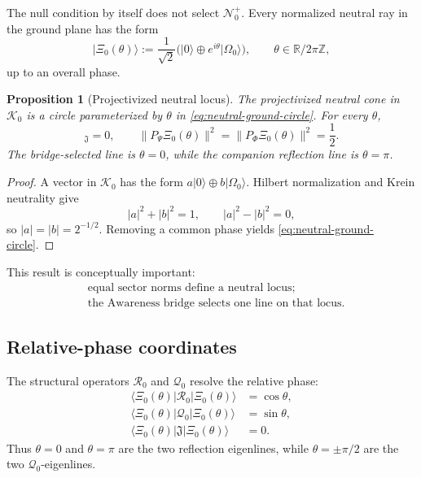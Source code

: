 \documentclass[11pt,reqno]{scrartcl}
\newcommand{\RR}{\mathbb R}
\newcommand{\ZZ}{\mathbb Z}
\newcommand{\fundJ}{\mathfrak J}
\newcommand{\PP}{P_{\Psi}}
\newcommand{\PF}{P_{\Phi}}
\newcommand{\Kzero}{\mathscr K_{0}}
\newcommand{\Rzero}{\mathcal R_{0}}
\newcommand{\Qzero}{\mathcal Q_{0}}
\newcommand{\NzeroPlus}{\mathscr N_{0}^{+}}
\newcommand{\ket}[1]{\lvert #1\rangle}
\newcommand{\bra}[1]{\langle #1\rvert}
\newcommand{\kInner}[2]{[#1,#2]_{\fundJ}}
\theoremstyle{plain}
\newtheorem{proposition}[proposition]{Proposition}
\theoremstyle{definition}
\theoremstyle{remark}
\begin{document}
The null condition by itself does not select \(\NzeroPlus\).  Every normalized
neutral ray in the ground plane has the form
\begin{equation}
  \boxed{
  \ket{\Xi_0(\theta)}
  :=\frac1{\sqrt2}
  \bigl(\ket0\oplus e^{i\theta}\ket{\Omega_0}\bigr),
  \qquad
  \theta\in\RR/2\pi\ZZ,}
  \label{eq:neutral-ground-circle}
\end{equation}
up to an overall phase.

\begin{proposition}[Projectivized neutral locus]
\label{prop:projectivized-neutral-locus}
The projectivized neutral cone in \(\Kzero\) is a circle parameterized by
\(\theta\) in \eqref{eq:neutral-ground-circle}.  For every \(\theta\),
\begin{equation}
  \kInner{\Xi_0(\theta)}{\Xi_0(\theta)}=0,
  \qquad
  \|\PP\Xi_0(\theta)\|^2
  =\|\PF\Xi_0(\theta)\|^2=\frac12.
  \label{eq:neutral-circle-common-properties}
\end{equation}
The bridge-selected line is \(\theta=0\), while the companion reflection
line is \(\theta=\pi\).
\end{proposition}

\begin{proof}
A vector in \(\Kzero\) has the form
\(a\ket0\oplus b\ket{\Omega_0}\).  Hilbert normalization and Krein
neutrality give
\begin{equation}
  |a|^2+|b|^2=1,
  \qquad
  |a|^2-|b|^2=0,
\end{equation}
so \(|a|=|b|=2^{-1/2}\).  Removing a common phase yields
\eqref{eq:neutral-ground-circle}.
\end{proof}

This result is conceptually important:
\begin{equation}
  \boxed{
  \begin{aligned}
  &\text{equal sector norms define a neutral locus;}\\
  &\text{the Awareness bridge selects one line on that locus.}
  \end{aligned}}
  \label{eq:null-locus-versus-bridge-selection}
\end{equation}

\subsection{Relative-phase coordinates}

The structural operators \(\Rzero\) and \(\Qzero\) resolve the relative phase:
\begin{align}
  \bra{\Xi_0(\theta)}\Rzero\ket{\Xi_0(\theta)}
  &=\cos\theta,
  \label{eq:R0-phase-expectation}\\
  \bra{\Xi_0(\theta)}\Qzero\ket{\Xi_0(\theta)}
  &=\sin\theta,
  \label{eq:Q0-phase-expectation}\\
  \bra{\Xi_0(\theta)}\fundJ\ket{\Xi_0(\theta)}
  &=0.
  \label{eq:J-phase-expectation}
\end{align}
Thus \(\theta=0\) and \(\theta=\pi\) are the two reflection eigenlines,
while \(\theta=\pm\pi/2\) are the two \(\Qzero\)-eigenlines.
\end{document}
